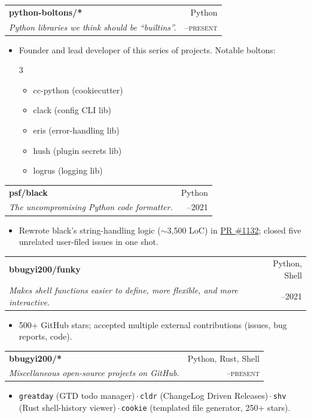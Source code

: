 \documentclass[letterpaper,11pt]{article}
\makeatletter
\newcommand{\projsubheading}[4]{%
  \par\addvspace{4pt}%
  \noindent
  \begin{tabular*}{\textwidth}{@{}l@{\extracolsep{\fill}}r@{}}
    {\sffamily\bfseries\color{batblack}\fontsize{11pt}{13pt}\selectfont #1} &
    {\ttfamily\color{batstone}\fontsize{9pt}{11pt}\selectfont #2} \\[1pt]
    {\itshape\color{batink}\fontsize{11pt}{13pt}\selectfont #3} &
    {\sffamily\scshape\color{batstone}\fontsize{9.5pt}{11.5pt}\selectfont #4}
  \end{tabular*}\par\vspace{-2pt}
}
\makeatother
\begin{document}
\projsubheading{python-boltons/*}{Python}{Python libraries we think should be ``builtins''.}{2021--present}
\begin{itemize}
  \item Founder and lead developer of this series of projects. Notable boltons:
  \vspace{-0.40cm}
  \begin{multicols}{3}
    \begin{itemize}
      \item cc-python (cookiecutter)
      \item clack (config CLI lib)
      \item eris (error-handling lib)
      \item hush (plugin secrets lib)
      \item logrus (logging lib)
    \end{itemize}
  \end{multicols}
  \vspace{-0.40cm}
\end{itemize}

\projsubheading{psf/black}{Python}{The uncompromising Python code formatter.}{2019--2021}
\begin{itemize}
  \item Rewrote black's string-handling logic ($\sim$3{,}500 LoC) in \href{https://github.com/psf/black/pull/1132}{PR \#1132}; closed five unrelated user-filed issues in one shot.
\end{itemize}

\projsubheading{bbugyi200/funky}{Python, Shell}{Makes shell functions easier to define, more flexible, and more interactive.}{2017--2021}
\begin{itemize}
  \item 500+ GitHub stars; accepted multiple external contributions (issues, bug reports, code).
\end{itemize}

\projsubheading{bbugyi200/*}{Python, Rust, Shell}{Miscellaneous open-source projects on GitHub.}{2017--present}
\begin{itemize}
  \item \texttt{greatday} (GTD todo manager)\,$\cdot$\,\texttt{cldr} (ChangeLog Driven Releases)\,$\cdot$\,\texttt{shv} (Rust shell-history viewer)\,$\cdot$\,\texttt{cookie} (templated file generator, 250+ stars).
\end{itemize}
\end{document}
